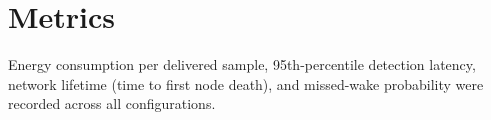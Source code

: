 \section{Metrics}
Energy consumption per delivered sample, 95th-percentile detection latency, network lifetime
(time to first node death), and missed-wake probability were recorded across all
configurations.
